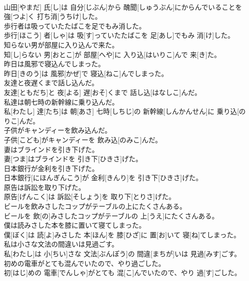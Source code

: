 \documentclass[8pt]{extreport}
\begin{document}
\begin{CJK}{UTF8}{min}
\\	山田[やまだ] 氏[し]は 自分[じぶん]から 醜聞[しゅうぶん]にからんでいることを 強[つよ]く 打ち消[うちけ]した。
\\	歩行者は吸っていたたばこを足でもみ消した。	
\\	歩行[ほこう] 者[しゃ]は 吸[す]っていたたばこを 足[あし]でもみ 消[け]した。
\\	知らない男が部屋に入り込んで来た。	
\\	知[し]らない 男[おとこ]が 部屋[へや]に 入り込[はいりこ]んで 来[き]た。
\\	昨日は風邪で寝込んでしまった。	
\\	昨日[きのう]は 風邪[かぜ]で 寝込[ねこ]んでしまった。
\\	友達と夜遅くまで話し込んだ。	
\\	友達[ともだち]と 夜[よる] 遅[おそ]くまで 話し込[はなしこ]んだ。
\\	私達は朝七時の新幹線に乗り込んだ。	
\\	私[わたし] 達[たち]は 朝[あさ] 七時[しちじ]の 新幹線[しんかんせん]に 乗り込[のりこ]んだ。
\\	子供がキャンディーを飲み込んだ。	
\\	子供[こども]がキャンディーを 飲み込[のみこ]んだ。
\\	妻はブラインドを引き下げた。	
\\	妻[つま]はブラインドを 引き下[ひきさ]げた。
\\	日本銀行が金利を引き下げた。	
\\	日本銀行[にほんぎんこう]が 金利[きんり]を 引き下[ひきさ]げた。
\\	原告は訴訟を取り下げた。	
\\	原告[げんこく]は 訴訟[そしょう]を 取り下[とりさ]げた。
\\	ビールを飲みさしたコップがテーブルの上にたくさんある。	
\\	ビールを 飲[の]みさしたコップがテーブルの 上[うえ]にたくさんある。
\\	僕は読みさした本を膝に置いて寝てしまった。	
\\	僕[ぼく]は 読[よ]みさした 本[ほん]を 膝[ひざ]に 置[お]いて 寝[ね]てしまった。
\\	私は小さな文法の間違いは見過ごす。	
\\	私[わたし]は 小[ちい]さな 文法[ぶんぽう]の 間違[まちが]いは 見過[みす]ごす。
\\	初めの電車がとても混んでいたので、やり過ごした。	
\\	初[はじ]めの 電車[でんしゃ]がとても 混[こ]んでいたので、やり 過[す]ごした。

\end{CJK}
\end{document}
